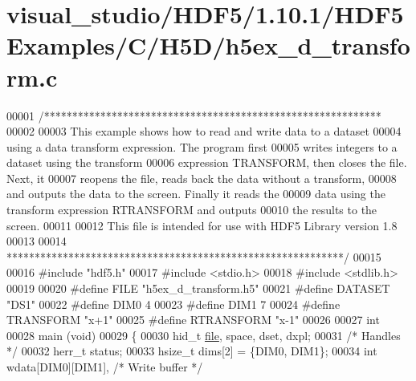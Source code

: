 \hypertarget{visual__studio_2_h_d_f5_21_810_81_2_h_d_f5_examples_2_c_2_h5_d_2h5ex__d__transform_8c_source}{}\section{visual\+\_\+studio/\+H\+D\+F5/1.10.1/\+H\+D\+F5\+Examples/\+C/\+H5\+D/h5ex\+\_\+d\+\_\+transform.c}
\label{visual__studio_2_h_d_f5_21_810_81_2_h_d_f5_examples_2_c_2_h5_d_2h5ex__d__transform_8c_source}

\begin{DoxyCode}
00001 \textcolor{comment}{/************************************************************}
00002 \textcolor{comment}{}
00003 \textcolor{comment}{  This example shows how to read and write data to a dataset}
00004 \textcolor{comment}{  using a data transform expression.  The program first}
00005 \textcolor{comment}{  writes integers to a dataset using the transform}
00006 \textcolor{comment}{  expression TRANSFORM, then closes the file.  Next, it}
00007 \textcolor{comment}{  reopens the file, reads back the data without a transform,}
00008 \textcolor{comment}{  and outputs the data to the screen.  Finally it reads the}
00009 \textcolor{comment}{  data using the transform expression RTRANSFORM and outputs}
00010 \textcolor{comment}{  the results to the screen.}
00011 \textcolor{comment}{}
00012 \textcolor{comment}{  This file is intended for use with HDF5 Library version 1.8}
00013 \textcolor{comment}{}
00014 \textcolor{comment}{ ************************************************************/}
00015 
00016 \textcolor{preprocessor}{#include "hdf5.h"}
00017 \textcolor{preprocessor}{#include <stdio.h>}
00018 \textcolor{preprocessor}{#include <stdlib.h>}
00019 
00020 \textcolor{preprocessor}{#define FILE            "h5ex\_d\_transform.h5"}
00021 \textcolor{preprocessor}{#define DATASET         "DS1"}
00022 \textcolor{preprocessor}{#define DIM0            4}
00023 \textcolor{preprocessor}{#define DIM1            7}
00024 \textcolor{preprocessor}{#define TRANSFORM       "x+1"}
00025 \textcolor{preprocessor}{#define RTRANSFORM      "x-1"}
00026 
00027 \textcolor{keywordtype}{int}
00028 main (\textcolor{keywordtype}{void})
00029 \{
00030     hid\_t           \hyperlink{structfile}{file}, space, dset, dxpl;
00031                                                 \textcolor{comment}{/* Handles */}
00032     herr\_t          status;
00033     hsize\_t         dims[2] = \{DIM0, DIM1\};
00034     \textcolor{keywordtype}{int}             wdata[DIM0][DIM1],          \textcolor{comment}{/* Write buffer */}

\end{DoxyCode}
